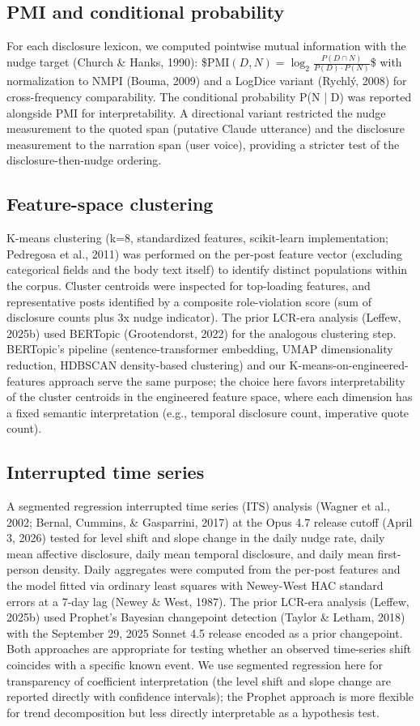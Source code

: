 \documentclass{obelus-preprint}
\begin{document}
\subsection{PMI and conditional probability}
For each disclosure lexicon, we computed pointwise mutual information with the nudge target (Church \& Hanks, 1990):
\$$\text{PMI}(D, N) = \log_2 \frac{P(D \cap N)}{P(D) \cdot P(N)}$\$
with normalization to NMPI (Bouma, 2009) and a LogDice variant (Rychlý, 2008) for cross-frequency comparability. The conditional probability P(N | D) was reported alongside PMI for interpretability. A directional variant restricted the nudge measurement to the quoted span (putative Claude utterance) and the disclosure measurement to the narration span (user voice), providing a stricter test of the disclosure-then-nudge ordering.
\subsection{Feature-space clustering}
K-means clustering (k=8, standardized features, scikit-learn implementation; Pedregosa et al., 2011) was performed on the per-post feature vector (excluding categorical fields and the body text itself) to identify distinct populations within the corpus. Cluster centroids were inspected for top-loading features, and representative posts identified by a composite role-violation score (sum of disclosure counts plus 3x nudge indicator). The prior LCR-era analysis (Leffew, 2025b) used BERTopic (Grootendorst, 2022) for the analogous clustering step. BERTopic's pipeline (sentence-transformer embedding, UMAP dimensionality reduction, HDBSCAN density-based clustering) and our K-means-on-engineered-features approach serve the same purpose; the choice here favors interpretability of the cluster centroids in the engineered feature space, where each dimension has a fixed semantic interpretation (e.g., temporal disclosure count, imperative quote count).
\subsection{Interrupted time series}
A segmented regression interrupted time series (ITS) analysis (Wagner et al., 2002; Bernal, Cummins, \& Gasparrini, 2017) at the Opus 4.7 release cutoff (April 3, 2026) tested for level shift and slope change in the daily nudge rate, daily mean affective disclosure, daily mean temporal disclosure, and daily mean first-person density. Daily aggregates were computed from the per-post features and the model fitted via ordinary least squares with Newey-West HAC standard errors at a 7-day lag (Newey \& West, 1987). The prior LCR-era analysis (Leffew, 2025b) used Prophet's Bayesian changepoint detection (Taylor \& Letham, 2018) with the September 29, 2025 Sonnet 4.5 release encoded as a prior changepoint. Both approaches are appropriate for testing whether an observed time-series shift coincides with a specific known event. We use segmented regression here for transparency of coefficient interpretation (the level shift and slope change are reported directly with confidence intervals); the Prophet approach is more flexible for trend decomposition but less directly interpretable as a hypothesis test.
\end{document}
